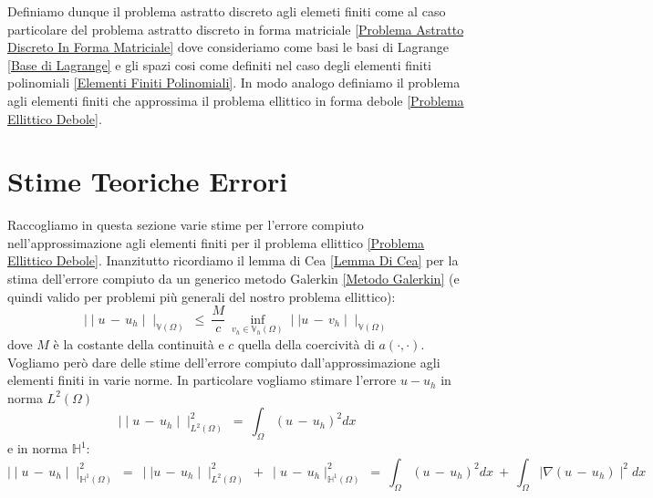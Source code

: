 \documentclass[12pt,a4paper]{report}
\theoremstyle{theorem}
\theoremstyle{theorem}
\theoremstyle{definition}
\begin{document}
Definiamo dunque il problema astratto discreto agli elemeti finiti come al caso particolare del problema astratto discreto in forma matriciale \ref{Problema Astratto Discreto In Forma Matriciale} dove consideriamo come basi le basi di Lagrange \ref{Base di Lagrange} e gli spazi cosi come definiti nel caso degli elementi finiti polinomiali \ref{Elementi Finiti Polinomiali}. In modo analogo definiamo il problema agli elementi finiti che approssima il problema ellittico in forma debole \ref{Problema Ellittico Debole}.

\section{Stime Teoriche Errori}
Raccogliamo in questa sezione varie stime per l'errore compiuto nell'approssimazione agli elementi finiti per il problema ellittico \ref{Problema Ellittico Debole}. Inanzitutto ricordiamo il lemma di Cea \ref{Lemma Di Cea} per la stima dell'errore compiuto da un generico metodo Galerkin \ref{Metodo Galerkin} (e quindi valido per problemi più generali del nostro problema ellittico):
\[ \mid \mid u \, - \, u_{h} \mid \mid_{\mathbb{V}(\Omega)} \ \leq \ \frac{M}{c} \ \inf_{v_{h} \in \mathbb{V}_{h}(\Omega)} \mid \mid u \, - \, v_{h} \mid \mid_{\mathbb{V}(\Omega)} \]
dove $M$ è la costante della continuità e $c$ quella della coercività di $a(\cdot,\cdot)$. Vogliamo però dare delle stime dell'errore compiuto dall'approssimazione agli elementi finiti in varie norme. In particolare vogliamo stimare l'errore $u - u_{h}$ in norma $L^{2}(\Omega)$
\[ \mid \mid u \, - \, u_{h} \mid \mid_{L^{2}(\Omega)}^{2} \ = \ \int_{\Omega} { (u \, - \, u_{h})^{2} dx}\]
e in norma $\mathbb{H}^{1}$:
\[ \mid \mid u \, - \, u_{h} \mid \mid_{\mathbb{H}^{1}(\Omega)}^{2} \ = \ \mid \mid u \, - \, u_{h} \mid \mid_{L^{2}(\Omega)}^{2} \ + \ \mid u \, - \, u_{h} \mid_{\mathbb{H}^{1}(\Omega)}^{2} \ = \ \int_{\Omega} { (u \, - \, u_{h})^{2} dx} \ + \ \int_{\Omega} { \mid \nabla(u \, - \, u_{h}) \mid^{2} dx}\]
\hfill \\
\end{document}
